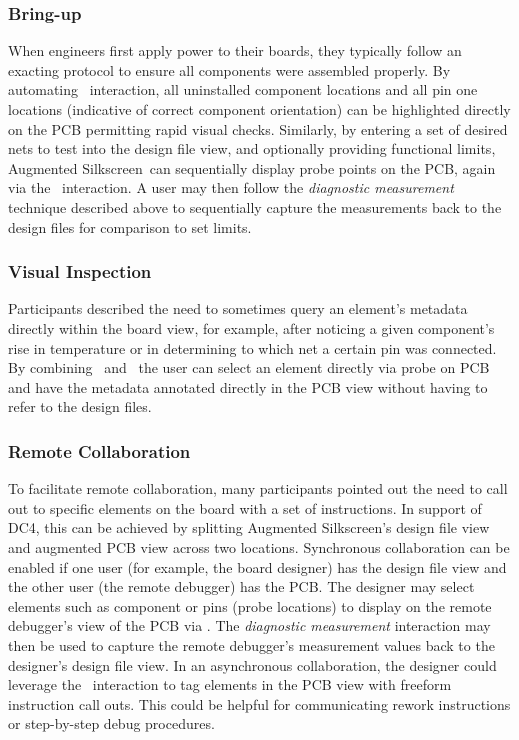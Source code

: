 \documentclass [11pt, proquest] {uwthesis}[2020/02/24]
\newcommand{\ASname}{Augmented Silkscreen}
\begin{document}
\subsubsection{Bring-up}
When engineers first apply power to their boards, they typically follow an exacting protocol to ensure all components were assembled properly.
By automating \ElemLocOnPCB\ interaction, all uninstalled component locations and all pin one locations (indicative of correct component orientation) can be highlighted directly on the PCB permitting rapid visual checks. Similarly, by entering a set of desired nets to test into the design file view, and optionally providing functional limits, \ASname\ can sequentially display probe points on the PCB, again via the \ElemLocOnPCB\ interaction. A user may then follow the \textit{diagnostic measurement} technique described above to sequentially capture the measurements back to the design files for comparison to set limits.

\subsubsection{Visual Inspection}
Participants described the need to sometimes query an element's metadata directly within the board view, for example, after noticing a given component's rise in temperature or in determining to which net a certain pin was connected. By combining \ElemIdOnDesFiles\ and \MetaDataOnPCB\, the user can select an element directly via probe on PCB and have the metadata annotated directly in the PCB view without having to refer to the design files.

\subsubsection{Remote Collaboration}
To facilitate remote collaboration, many participants pointed out the need to call out to specific elements on the board with a set of instructions.
In support of DC4,
this can be achieved by splitting \ASname's design file view and augmented PCB view across two locations.
Synchronous collaboration can be enabled if one user (for example, the board designer) has the design file view and the other user (the remote debugger) has the PCB.
The designer may select elements such as component or pins (probe locations) to display on the remote debugger's view of the PCB via \ElemLocOnPCB.
The \textit{diagnostic measurement} interaction may then be used to capture the remote debugger's measurement values back to the designer's design file view.
In an asynchronous collaboration, the designer could leverage the \MetaDataOnPCB\ interaction to tag elements in the PCB view with freeform instruction call outs. This could be helpful for communicating rework instructions or step-by-step debug procedures.
\end{document}

